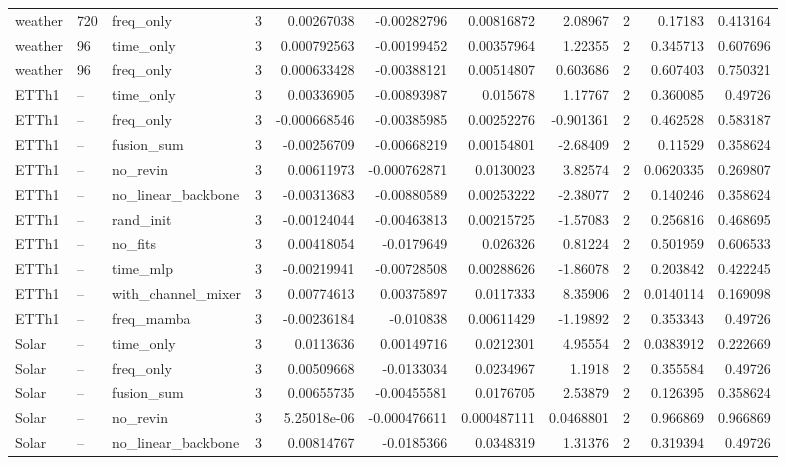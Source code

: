 \begin{longtable}{lllrrrrrrrr}
weather & 720 & freq\_only & 3 & 0.00267038 & -0.00282796 & 0.00816872 & 2.08967 & 2 & 0.17183 & 0.413164 \\
weather & 96 & time\_only & 3 & 0.000792563 & -0.00199452 & 0.00357964 & 1.22355 & 2 & 0.345713 & 0.607696 \\
weather & 96 & freq\_only & 3 & 0.000633428 & -0.00388121 & 0.00514807 & 0.603686 & 2 & 0.607403 & 0.750321 \\
ETTh1 & -- & time\_only & 3 & 0.00336905 & -0.00893987 & 0.015678 & 1.17767 & 2 & 0.360085 & 0.49726 \\
ETTh1 & -- & freq\_only & 3 & -0.000668546 & -0.00385985 & 0.00252276 & -0.901361 & 2 & 0.462528 & 0.583187 \\
ETTh1 & -- & fusion\_sum & 3 & -0.00256709 & -0.00668219 & 0.00154801 & -2.68409 & 2 & 0.11529 & 0.358624 \\
ETTh1 & -- & no\_revin & 3 & 0.00611973 & -0.000762871 & 0.0130023 & 3.82574 & 2 & 0.0620335 & 0.269807 \\
ETTh1 & -- & no\_linear\_backbone & 3 & -0.00313683 & -0.00880589 & 0.00253222 & -2.38077 & 2 & 0.140246 & 0.358624 \\
ETTh1 & -- & rand\_init & 3 & -0.00124044 & -0.00463813 & 0.00215725 & -1.57083 & 2 & 0.256816 & 0.468695 \\
ETTh1 & -- & no\_fits & 3 & 0.00418054 & -0.0179649 & 0.026326 & 0.81224 & 2 & 0.501959 & 0.606533 \\
ETTh1 & -- & time\_mlp & 3 & -0.00219941 & -0.00728508 & 0.00288626 & -1.86078 & 2 & 0.203842 & 0.422245 \\
ETTh1 & -- & with\_channel\_mixer & 3 & 0.00774613 & 0.00375897 & 0.0117333 & 8.35906 & 2 & 0.0140114 & 0.169098 \\
ETTh1 & -- & freq\_mamba & 3 & -0.00236184 & -0.010838 & 0.00611429 & -1.19892 & 2 & 0.353343 & 0.49726 \\
Solar & -- & time\_only & 3 & 0.0113636 & 0.00149716 & 0.0212301 & 4.95554 & 2 & 0.0383912 & 0.222669 \\
Solar & -- & freq\_only & 3 & 0.00509668 & -0.0133034 & 0.0234967 & 1.1918 & 2 & 0.355584 & 0.49726 \\
Solar & -- & fusion\_sum & 3 & 0.00655735 & -0.00455581 & 0.0176705 & 2.53879 & 2 & 0.126395 & 0.358624 \\
Solar & -- & no\_revin & 3 & 5.25018e-06 & -0.000476611 & 0.000487111 & 0.0468801 & 2 & 0.966869 & 0.966869 \\
Solar & -- & no\_linear\_backbone & 3 & 0.00814767 & -0.0185366 & 0.0348319 & 1.31376 & 2 & 0.319394 & 0.49726 \\

\end{longtable}

